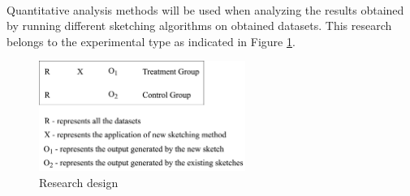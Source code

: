 \paragraph{}
Quantitative analysis methods will be used when analyzing the results obtained by running different sketching algorithms on obtained datasets. This research belongs to the experimental type as indicated in Figure \ref{figure:design}. 

\begin{figure}[H]
    \centering
    \includegraphics[width=0.6\textwidth]{images/design}
    \caption{Research design}
    \label{figure:design}
\end{figure}
